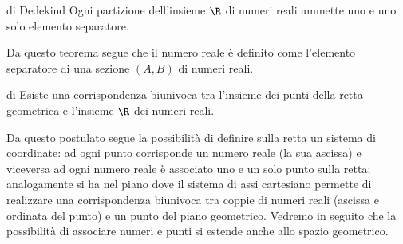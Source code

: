 \begin{postulato}{di Dedekind}{}
Ogni partizione dell'insieme \(\R\) di numeri reali ammette uno e uno solo 
elemento separatore.
\end{postulato}

Da questo teorema segue che il numero reale è definito come l'elemento 
separatore di una sezione \((A,B)\) di numeri reali.

\begin{postulato}{di }{} 
Esiste una corrispondenza biunivoca tra l'insieme dei punti della retta 
geometrica e l'insieme \(\R\) dei numeri reali. 
\end{postulato}

Da questo postulato segue la possibilità di definire sulla retta un sistema 
di coordinate: ad ogni punto corrisponde un numero reale (la sua ascissa) e 
viceversa ad ogni numero reale è associato uno e un solo punto sulla retta; 
analogamente si ha nel piano dove il sistema di assi cartesiano permette di 
realizzare una corrispondenza biunivoca tra coppie di numeri reali (ascissa 
e ordinata del punto) e un punto del piano geometrico. 
Vedremo in seguito che la possibilità di associare numeri e punti si estende 
anche allo spazio geometrico.

% 


